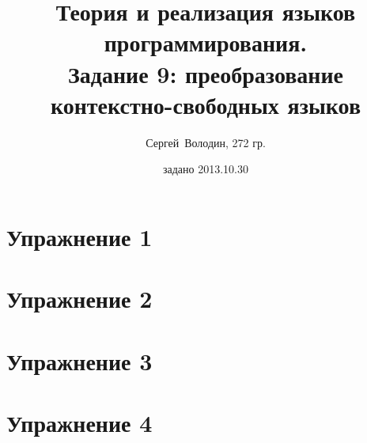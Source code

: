 \documentclass[a4paper]{article}
\title{Теория и реализация языков программирования.\\Задание 9: преобразование контекстно-свободных языков}
\date{задано 2013.10.30}
\author{Сергей~Володин, 272 гр.}
\begin{document}
\maketitle
\section*{Упражнение 1}
\section*{Упражнение 2}
\section*{Упражнение 3}
\section*{Упражнение 4}
\end{document}
